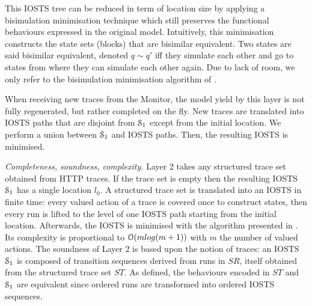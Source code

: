 This IOSTS tree can be reduced in term of location size by
applying a bisimulation minimisation technique which still
preserves the functional behaviours expressed in the original
model.  Intuitively, this minimisation constructs the state sets
(blocks) that are bisimilar equivalent. Two states are said
bisimilar equivalent, denoted $q \sim q'$ iff they simulate each
other and go to states from where they can simulate each other
again. Due to lack of room, we only refer to the bisimulation
minimisation algorithm of \cite{Fernandez89animplementation}.

When receiving new traces from the Monitor, the model yield by
this layer is not fully regenerated, but rather completed on the
fly. New traces are translated into IOSTS paths that are disjoint
from $\EuScript{S}_1$ except from the initial location. We
perform a union between $\EuScript{S}_1$ and IOSTS paths. Then,
the resulting IOSTS is minimised.

\textit{Completeness, soundness, complexity.} Layer 2 takes any
structured trace set obtained from HTTP traces. If the trace set
is empty then the resulting IOSTS $\EuScript{S}_1$ has a single
location $l_0$. A structured trace set is translated into an
IOSTS in finite time: every valued action of a trace is covered
once to construct states, then every run is lifted to the level
of one IOSTS path starting from the initial location. Afterwards,
the IOSTS is minimised with the algorithm presented in
\cite{Fernandez89animplementation}. Its complexity is
proportional to $\EuScript{O}(mlog (m+1))$ with $m$ the number of
valued actions. The soundness of Layer 2 is based upon the notion
of traces: an IOSTS $\EuScript{S}_1$ is composed of transition
sequences derived from runs in $SR$, itself obtained from the
structured trace set $ST$. As defined, the behaviours encoded in
$ST$ and $\EuScript{S}_1$ are equivalent since ordered runs are
transformed into ordered IOSTS sequences.

